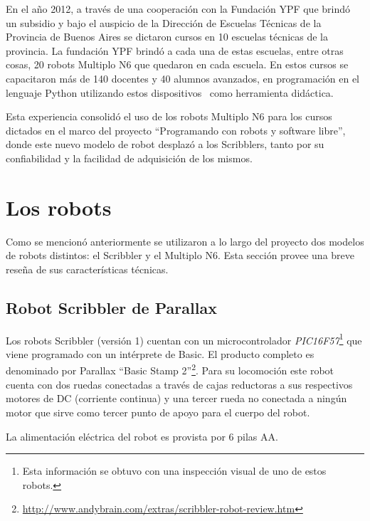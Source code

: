 En el año 2012, a través de una cooperación con la Fundación YPF que brindó
un subsidio y bajo el auspicio de la Dirección de Escuelas Técnicas de la
Provincia de Buenos Aires se dictaron cursos en 10 escuelas técnicas de la
provincia. La fundación YPF brindó a cada una de estas escuelas, entre otras
cosas, 20 robots Multiplo N6 que quedaron en cada escuela. En estos cursos
se capacitaron más de 140 docentes y 40 alumnos avanzados, en programación
en el lenguaje Python utilizando
estos dispositivos~\citep{diaz_aprendiendo_2012} como herramienta didáctica.

Esta experiencia consolidó el uso de
los robots Multiplo N6 para los cursos dictados en el marco del proyecto
``Programando con robots y software libre'',  donde este nuevo modelo de  robot desplazó
a los Scribblers, tanto por su confiabilidad y la facilidad de adquisición de los mismos.



\section{Los robots}
Como se mencionó anteriormente se utilizaron a lo largo del proyecto dos
modelos de robots distintos: el Scribbler y el Multiplo N6. Esta sección provee una
breve reseña de sus características técnicas.

\subsection{Robot Scribbler de Parallax}
Los robots Scribbler (versión 1) cuentan con un microcontrolador
\textit{PIC16F57}\footnote{Esta información se obtuvo con una inspección
visual de uno de estos robots.}
que viene programado con un intérprete de Basic. El producto
completo es denominado por Parallax
``Basic Stamp 2''\footnote{\url{http://www.andybrain.com/extras/scribbler-robot-review.htm}}.
Para su locomoción este robot cuenta con dos ruedas conectadas a través de
cajas
reductoras
a sus respectivos motores de DC (corriente continua)  y una tercer rueda no conectada a ningún
motor que sirve como tercer punto de apoyo para el cuerpo del robot.

La alimentación eléctrica del robot es provista por 6 pilas AA.

